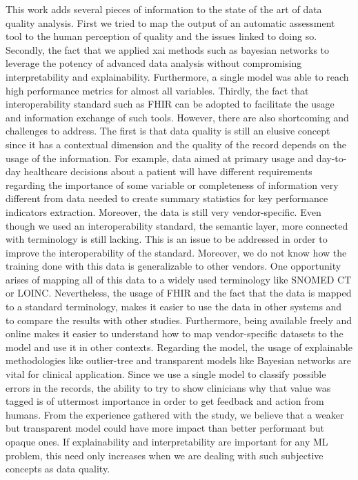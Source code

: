 This work adds several pieces of information to the state of the art of data quality analysis. First we tried to map the output of an automatic assessment tool to the human perception of quality and the issues linked to doing so. Secondly, the fact that we applied \ac{xai} methods such as bayesian networks to leverage the potency of advanced data analysis without compromising interpretability and explainability. Furthermore, a single model was able to reach high performance metrics for almost all variables. Thirdly, the fact that interoperability standard such as FHIR can be adopted to facilitate the usage and information exchange of such tools. However, there are also shortcoming and challenges to address. The first is that data quality is still an elusive concept since it has a contextual dimension and the quality of the record depends on the usage of the information. For example, data aimed at primary usage and day-to-day healthcare decisions about a patient will have different requirements regarding the importance of some variable or completeness of information very different from data needed to create summary statistics for key performance indicators extraction. Moreover, the data is still very vendor-specific. Even though we used an interoperability standard, the semantic layer, more connected with terminology is still lacking. This is an issue to be addressed in order to improve the interoperability of the standard. Moreover, we do not know how the training done with this data is generalizable to other vendors. One opportunity arises of mapping all of this data to a widely used terminology like SNOMED CT or LOINC. Nevertheless, the usage of FHIR and the fact that the data is mapped to a standard terminology, makes it easier to use the data in other systems and to compare the results with other studies. Furthermore, being available freely and online makes it easier to understand how to map vendor-specific datasets to the model and use it in other contexts. Regarding the model, the usage of explainable methodologies like outlier-tree and transparent models like Bayesian networks are vital for clinical application. Since we use a single model to classify possible errors in the records, the ability to try to show clinicians why that value was tagged is of uttermost importance in order to get feedback and action from humans. From the experience gathered with the study, we believe that a weaker but transparent model could have more impact than better performant but opaque ones. If explainability and interpretability are important for any ML problem, this need only increases when we are dealing with such subjective concepts as data quality.

